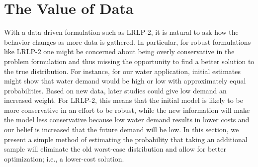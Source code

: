 \documentclass[11pt]{article}
\begin{document}
% 


\section{The Value of Data} \label{sec:value}

With a data driven formulation such as LRLP-2, it is natural to ask how the behavior changes as more data is gathered.
In particular, for robust formulations like LRLP-2 one might be concerned about being overly conservative in the problem formulation and thus missing the opportunity to find a better solution to the true distribution.
For instance, for our water application, initial estimates might show that water demand would be high or low with approximately equal probabilities. 
Based on new data, later studies could give low demand an increased weight.  
For LRLP-2, this means that the initial model is likely to be more conservative in an effort to be robust, while the new information will make the model less conservative because low water demand results in lower costs and our belief is increased that the future demand will be low.  
In this section, we present a simple method of estimating the probability that taking an additional sample will eliminate the old worst-case distribution and allow for better optimization; i.e., a lower-cost solution.
\end{document}
